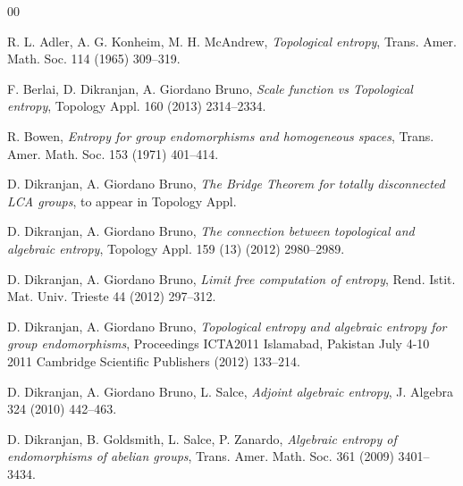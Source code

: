\documentclass[11pt]{article}
\theoremstyle{definition}
\numberwithin{equation}{section}
\begin{document}
\begin{thebibliography}{00}

\small{

 R. L. Adler, A. G. Konheim, M. H. McAndrew, \emph{Topological entropy}, Trans. Amer. Math. Soc. 114 (1965) 309--319.

 F. Berlai, D. Dikranjan, A. Giordano Bruno, \emph{Scale function vs Topological entropy}, Topology Appl. 160 (2013) 2314--2334.

 R. Bowen, \emph{Entropy for group endomorphisms and homogeneous spaces}, Trans. Amer. Math. Soc. 153 (1971) 401--414.



 D. Dikranjan, A. Giordano Bruno, \emph{The Bridge Theorem for totally disconnected LCA groups}, to appear in Topology Appl.

 D. Dikranjan, A. Giordano Bruno, \emph{The connection between topological and algebraic entropy}, Topology Appl. 159 (13) (2012) 2980--2989.

 D. Dikranjan, A. Giordano Bruno, \emph{Limit free computation of entropy}, Rend. Istit. Mat. Univ. Trieste 44 (2012) 297--312.


 D. Dikranjan, A. Giordano Bruno, \emph{Topological entropy and algebraic entropy for group endomorphisms}, Proceedings ICTA2011 Islamabad, Pakistan July 4-10 2011 Cambridge Scientific Publishers (2012) 133--214.

 D. Dikranjan, A. Giordano Bruno, L. Salce, \emph{Adjoint algebraic entropy}, J. Algebra 324 (2010) 442--463.

 D. Dikranjan, B. Goldsmith, L. Salce, P. Zanardo, \emph{Algebraic entropy of endomorphisms of abelian groups}, Trans. Amer. Math. Soc. {361} (2009) 3401--3434.


}
\end{thebibliography}
\end{document}
